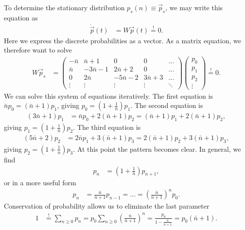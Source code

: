 \documentclass[english, parskip=full]{scrartcl}
\newcommand{\kla}{}
\begin{document}
To determine the stationary distribution $p_s(n)\equiv\vec{p}_s$, we may write this equation as
\begin{align}
\dot{\vec{p}}(t) &= W\vec{p}(t) \overset{!}{=} 0.
\end{align}
Here we express the discrete probabilities as a vector.
As a matrix equation, we therefore want to solve
\begin{align}
W\vec{p}_s &= \begin{pmatrix}
-\bar{n} & \bar{n} + 1 & 0 & 0 & \dots \\
\bar{n} & -3\bar{n} - 1 & 2\bar{n} + 2 & 0 & \dots \\ 
0 & 2\bar{n} & -5\bar{n} - 2 & 3\bar{n} + 3 & \dots \\
\vdots & \vdots & \vdots & \vdots & \ddots
\end{pmatrix}\begin{pmatrix}
p_0 \\ p_1 \\ p_2 \\ \vdots 
\end{pmatrix} \overset{!}{=} 0.
\end{align}
We can solve this system of equations iteratively.
The first equation is $\bar{n} p_0 = (\bar{n}+1)p_1$, giving $p_0 = \kla\left( 1 + \frac{1}{\bar{n}} \right)p_1$.
The second equation is 
\begin{align}
(3\bar{n}+1)p_1 &= \bar{n}p_0 + 2(\bar{n}+1)p_2 = (\bar{n}+1)p_1 + 2(\bar{n}+1)p_2,
\end{align}
giving $p_1 = \kla\left( 1 + \frac{1}{\bar{n}} \right)p_2$.
The third equation is
\begin{align}
(5\bar{n}+2)p_2 &= 2\bar{n}p_1 + 3(\bar{n}+1)p_3 = 2(\bar{n}+1)p_2 + 3(\bar{n}+1)p_3,
\end{align}
giving $p_2 = \kla\left( 1 + \frac{1}{\bar{n}} \right)p_3$.
At this point the pattern becomes clear.
In general, we find
\begin{align}
p_n &= \kla\left( 1 + \frac{1}{\bar{n}} \right)p_{n+1},
\end{align}
or in a more useful form
\begin{align}
p_n &= \frac{\bar{n}}{\bar{n} + 1}p_{n-1} = \dots = \kla\left( \frac{\bar{n}}{\bar{n} + 1} \right)^n p_0.
\end{align}
Conservation of probability allows us to eliminate the last parameter
\begin{align}
1 &\overset{!}{=} \sum_{n\ge 0} p_n = p_0 \sum_{n\ge 0} \kla\left( \frac{\bar{n}}{\bar{n} + 1} \right)^n = \frac{p_0}{1 - \frac{\bar{n}}{\bar{n} + 1}} = p_0\kla\left( \bar{n} + 1 \right).
\end{align}
\end{document}
